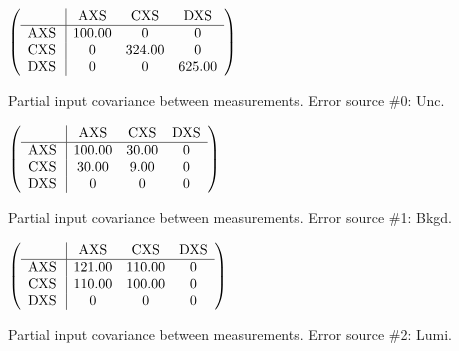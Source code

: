\begin{table}[H]
\scriptsize
\begin{center}
\renewcommand{\arraystretch}{1.1}
\begin{math}\left(\begin{array}{c|ccc}
 & \mathrm{AXS} & 
\mathrm{CXS} & 
\mathrm{DXS} \\
\hline
\mathrm{AXS} \hspace*{2pt} &     100.00 &  0 &  0 \\
\mathrm{CXS} \hspace*{2pt} &  0 &     324.00 &  0 \\
\mathrm{DXS} \hspace*{2pt} &  0 &  0 &     625.00 \\
\end{array}\right)\end{math}
\caption{Partial input covariance between measurements. Error source \#0: Unc.}
\renewcommand{\arraystretch}{1}
\end{center}
\end{table}
\begin{table}[H]
\scriptsize
\begin{center}
\renewcommand{\arraystretch}{1.1}
\begin{math}\left(\begin{array}{c|ccc}
 & \mathrm{AXS} & 
\mathrm{CXS} & 
\mathrm{DXS} \\
\hline
\mathrm{AXS} \hspace*{2pt} &     100.00 &      30.00 &  0 \\
\mathrm{CXS} \hspace*{2pt} &      30.00 &       9.00 &  0 \\
\mathrm{DXS} \hspace*{2pt} &  0 &  0 &  0 \\
\end{array}\right)\end{math}
\caption{Partial input covariance between measurements. Error source \#1: Bkgd.}
\renewcommand{\arraystretch}{1}
\end{center}
\end{table}
\begin{table}[H]
\scriptsize
\begin{center}
\renewcommand{\arraystretch}{1.1}
\begin{math}\left(\begin{array}{c|ccc}
 & \mathrm{AXS} & 
\mathrm{CXS} & 
\mathrm{DXS} \\
\hline
\mathrm{AXS} \hspace*{2pt} &     121.00 &     110.00 &  0 \\
\mathrm{CXS} \hspace*{2pt} &     110.00 &     100.00 &  0 \\
\mathrm{DXS} \hspace*{2pt} &  0 &  0 &  0 \\
\end{array}\right)\end{math}
\caption{Partial input covariance between measurements. Error source \#2: Lumi.}
\renewcommand{\arraystretch}{1}
\end{center}
\end{table}
\clearpage

